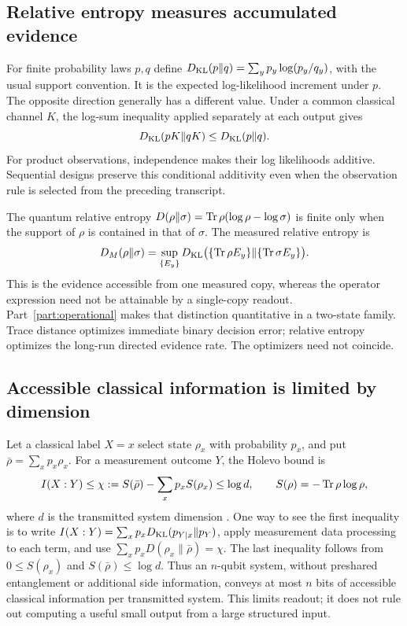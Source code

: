 \subsection{Relative entropy measures accumulated evidence}
For finite probability laws $p,q$ define
$D_{\rm KL}(p\|q)=\sum_y p_y\log(p_y/q_y)$, with the usual support
convention. It is the expected log-likelihood increment under $p$.
The opposite direction generally has a different value. Under a common
classical channel $K$, the log-sum inequality applied separately at each
output gives
\[
 D_{\rm KL}(pK\|qK)\leq D_{\rm KL}(p\|q).
\]
For product observations, independence makes their log likelihoods
additive. Sequential designs preserve this conditional additivity even
when the observation rule is selected from the preceding transcript.

The quantum relative entropy
$D(\rho\|\sigma)=\operatorname{Tr}\rho(\log\rho-\log\sigma)$ is finite only
when the support of $\rho$ is contained in that of $\sigma$.
The measured relative entropy is
\[
 D_M(\rho\|\sigma)=\sup_{\{E_y\}}
 D_{\rm KL}\bigl(\{\operatorname{Tr}\rho E_y\}\|\{\operatorname{Tr}\sigma E_y\}\bigr).
\]
This is the evidence accessible from one measured copy, whereas the
operator expression need not be attainable by a single-copy readout.
Part~\ref{part:operational} makes that distinction quantitative in a
two-state family. Trace distance optimizes immediate binary decision
error; relative entropy optimizes the long-run directed evidence rate.
The optimizers need not coincide.

\subsection{Accessible classical information is limited by dimension}
Let a classical label $X=x$ select state $\rho_x$ with probability $p_x$,
and put $\bar\rho=\sum_xp_x\rho_x$. For a measurement outcome $Y$,
the Holevo bound is
\begin{equation}\label{eq:holevo-foundations}
 I(X:Y)\leq\chi:=S(\bar\rho)-\sum_xp_xS(\rho_x)
 \leq\log d,\qquad S(\rho)=-\operatorname{Tr}\rho\log\rho,
\end{equation}
where $d$ is the transmitted system dimension \citep{holevo1973}.
One way to see the first inequality is to write
$I(X:Y)=\sum_xp_xD_{\rm KL}(p_{Y|x}\|p_Y)$, apply measurement
data processing to each term, and use
$\sum_xp_xD(\rho_x\|\bar\rho)=\chi$.
The last inequality follows from $0\leq S(\rho_x)$ and
$S(\bar\rho)\leq\log d$.
Thus an $n$-qubit system, without preshared entanglement or additional
side information, conveys at most $n$ bits of accessible classical
information per transmitted system. This limits readout; it does not
rule out computing a useful small output from a large structured input.

